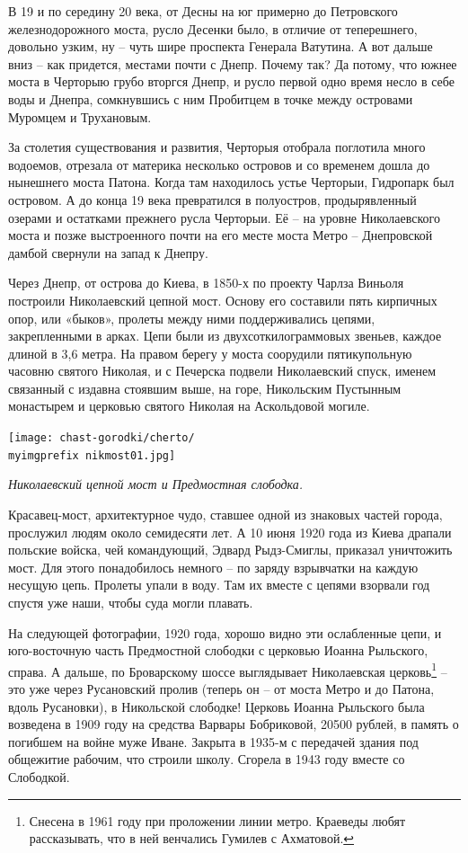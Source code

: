 В 19 и по середину 20 века, от Десны на юг примерно до Петровского железнодорожного моста, русло Десенки было, в отличие от теперешнего, довольно узким, ну – чуть шире проспекта Генерала Ватутина. А вот дальше вниз – как придется, местами почти с Днепр. Почему так? Да потому, что южнее моста в Черторыю грубо вторгся Днепр, и русло первой одно время несло в себе воды и Днепра, сомкнувшись с ним Пробитцем в точке между островами Муромцем и Трухановым.

За столетия существования и развития, Черторыя отобрала поглотила много водоемов, отрезала от материка несколько островов и со временем дошла до нынешнего моста Патона. Когда там находилось устье Черторыи, Гидропарк был островом. А до конца 19 века превратился в полуостров, продырявленный озерами и остатками прежнего русла Черторыи. Её – на уровне Николаевского моста и позже выстроенного почти на его месте моста Метро – Днепровской дамбой свернули на запад к Днепру. 

Через Днепр, от острова до Киева, в 1850-х по проекту Чарлза Виньоля построили Николаевский цепной мост. Основу его составили пять кирпичных опор, или «быков», пролеты между ними поддерживались цепями, закрепленными в арках. Цепи были из двухсоткилограммовых звеньев, каждое длиной в 3,6 метра. На правом берегу у моста соорудили пятикупольную часовню святого Николая, и с Печерска подвели Николаевский спуск, именем связанный с издавна стоявшим выше, на горе, Никольским Пустынным монастырем и церковью святого Николая на Аскольдовой могиле.

\begin{center}
\texttt{[image: chast-gorodki/cherto/\\myimgprefix nikmost01.jpg]}

\textit{Николаевский цепной мост и Предмостная слободка.}
\end{center}

Красавец-мост, архитектурное чудо, ставшее одной из знаковых частей города, прослужил людям около семидесяти лет. А 10 июня 1920 года из Киева драпали польские войска, чей командующий, Эдвард Рыдз-Смиглы, приказал уничтожить мост. Для этого понадобилось немного – по заряду взрывчатки на каждую несущую цепь. Пролеты упали в воду. Там их вместе с цепями взорвали год спустя уже наши, чтобы суда могли плавать.

На следующей фотографии, 1920 года, хорошо видно эти ослабленные цепи, и юго-восточную часть Предмостной слободки с церковью Иоанна Рыльского, справа. А дальше, по Броварскому шоссе выглядывает Николаевская церковь\footnote{Снесена в 1961 году при проложении линии метро. Краеведы любят рассказывать, что в ней венчались Гумилев с Ахматовой.} – это уже через Русановский пролив (теперь он – от моста Метро и до Патона, вдоль Русановки), в Никольской слободке! Церковь Иоанна Рыльского была возведена в 1909 году на средства Варвары Бобриковой, 20500 рублей, в память о погибшем на войне муже Иване. Закрыта в 1935-м с передачей здания под общежитие рабочим, что строили школу. Сгорела в 1943 году вместе со Слободкой.

